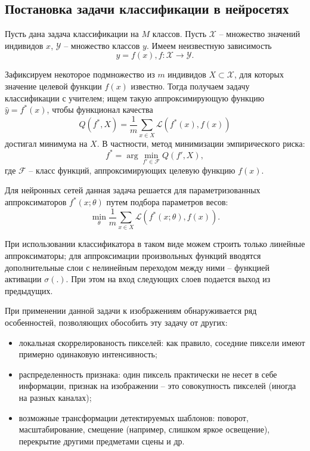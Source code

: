 \documentclass[12pt, specialist, subf, substylefile = spbu.rtx]{disser}
\begin{document}

\subsection{Постановка задачи классификации в нейросетях}

Пусть дана задача классификации на $M$ классов. Пусть $\mathcal{X}$ -- множество значений индивидов $x$, $\mathcal{Y}$ -- множество классов $y$. Имеем неизвестную зависимость
$$
y=f(x), f: \mathcal{X} \to \mathcal{Y}.
$$

Зафиксируем некоторое подмножество из $m$ индивидов $X \subset \mathcal{X}$, для которых значение целевой функции $f(x)$ известно. Тогда получаем задачу классификации с учителем; ищем такую аппроксимирующую функцию $\hat{y}=f^*(x)$, чтобы функционал качества 
$$
Q(f^*, X)=\frac{1}{m}\sum_{x\in X} \mathcal{L}(f^*(x), f(x))
$$
достигал минимума на $X$. В частности, метод минимизации эмпирического риска:
$$
f^*=\arg\min_{f'\in \mathcal{F}} Q(f', X),
$$
где $\mathcal{F}$ -- класс функций, аппроксимирующих целевую функцию $f(x)$.

Для нейронных сетей данная задача решается для параметризованных аппроксиматоров $f^*(x; \theta)$ путем подбора параметров весов:
$$
\min_{\theta} \frac{1}{m}\sum_{x\in X} \mathcal{L}(f^*(x; \theta), f(x)).
$$

При использовании классификатора в таком виде можем строить только линейные аппроксиматоры; для аппроксимации произвольных функций  вводятся дополнительные слои с нелинейным переходом между ними -- функцией активации $\sigma(.)$. При этом на вход следующих слоев подается выход из предыдущих.


При применении данной задачи к изображениям обнаруживается ряд особенностей, позволяющих обособить эту задачу от других:

\begin{itemize}

\item локальная скоррелированость пикселей: как правило, соседние пиксели имеют примерно одинаковую интенсивность;
\item распределенность признака: один пиксель практически не несет в себе информации, признак на изображении -- это совокупность пикселей (иногда на разных каналах);
\item возможные трансформации детектируемых шаблонов: поворот, масштабирование, смещение (например, слишком яркое освещение), перекрытие другими предметами сцены и др.

\end{itemize}
\end{document}
